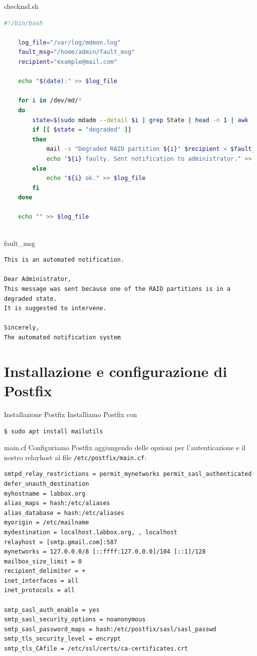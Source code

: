 \documentclass{beamer}
\begin{document}
\begin{frame}[fragile]{checkmd.sh}
\begin{lstlisting}[language=Bash]
    #!/bin/bash
    
    log_file="/var/log/mdmon.log"
    fault_msg="/home/admin/fault_msg"
    recipient="example@mail.com"
        
    echo "$(date):" >> $log_file
        
    for i in /dev/md/*
    do
        state=$(sudo mdadm --detail $i | grep State | head -n 1 | awk '{print $NF}')
        if [[ $state = "degraded" ]]
        then
            mail -s "Degraded RAID partition ${i}" $recipient < $fault_msg
            echo "${i} faulty. Sent notification to administrator." >> $log_file
        else
            echo "${i} ok." >> $log_file
        fi
    done
        
    echo "" >> $log_file
        
    \end{lstlisting}
\end{frame}

\begin{frame}[fragile]{fault\_msg}
\begin{lstlisting}
This is an automated notification.

Dear Administrator,
This message was sent because one of the RAID partitions is in a degraded state.
It is suggested to intervene.
    
Sincerely,
The automated notification system
\end{lstlisting}
\end{frame}

\section{Installazione e configurazione di Postfix}
\begin{frame}[fragile]{Installazione Postfix}
Installiamo Postfix con
\begin{verbatim}
$ sudo apt install mailutils
\end{verbatim}
\end{frame}

\begin{frame}[fragile]{main.cf}
Configuriamo Postfix aggiungendo delle opzioni per l'autenticazione e il nostro relayhost al file \texttt{/etc/postfix/main.cf}:
\begin{lstlisting}[]
smtpd_relay_restrictions = permit_mynetworks permit_sasl_authenticated defer_unauth_destination
myhostname = labbox.org
alias_maps = hash:/etc/aliases
alias_database = hash:/etc/aliases
myorigin = /etc/mailname
mydestination = localhost.labbox.org, , localhost
relayhost = [smtp.gmail.com]:587
mynetworks = 127.0.0.0/8 [::ffff:127.0.0.0]/104 [::1]/128
mailbox_size_limit = 0
recipient_delimiter = +
inet_interfaces = all
inet_protocols = all
    
smtp_sasl_auth_enable = yes
smtp_sasl_security_options = noanonymous
smtp_sasl_password_maps = hash:/etc/postfix/sasl/sasl_passwd
smtp_tls_security_level = encrypt
smtp_tls_CAfile = /etc/ssl/certs/ca-certificates.crt
\end{lstlisting}
\end{frame}
\end{document}
